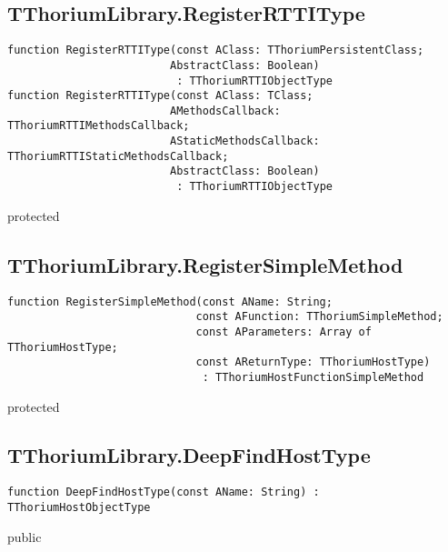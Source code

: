 \subsection{TThoriumLibrary.RegisterRTTIType}
\label{thoriumcore:thorium:tthoriumlibrary:registerrttitype}
\begin{FPCList}
\Synopsis
\Declaration 

\begin{verbatim}
function RegisterRTTIType(const AClass: TThoriumPersistentClass;
                         AbstractClass: Boolean)
                          : TThoriumRTTIObjectType
function RegisterRTTIType(const AClass: TClass;
                         AMethodsCallback: TThoriumRTTIMethodsCallback;
                         AStaticMethodsCallback: TThoriumRTTIStaticMethodsCallback;
                         AbstractClass: Boolean)
                          : TThoriumRTTIObjectType
\end{verbatim}
\Visibility
protected
\Description
\Errors
\end{FPCList}
\subsection{TThoriumLibrary.RegisterSimpleMethod}
\label{thoriumcore:thorium:tthoriumlibrary:registersimplemethod}
\begin{FPCList}
\Synopsis
\Declaration 

\begin{verbatim}
function RegisterSimpleMethod(const AName: String;
                             const AFunction: TThoriumSimpleMethod;
                             const AParameters: Array of TThoriumHostType;
                             const AReturnType: TThoriumHostType)
                              : TThoriumHostFunctionSimpleMethod
\end{verbatim}
\Visibility
protected
\Description
\Errors
\end{FPCList}
\subsection{TThoriumLibrary.DeepFindHostType}
\label{thoriumcore:thorium:tthoriumlibrary:deepfindhosttype}
\begin{FPCList}
\Synopsis
\Declaration 

\begin{verbatim}
function DeepFindHostType(const AName: String) : TThoriumHostObjectType
\end{verbatim}
\Visibility
public
\Description
\Errors
\end{FPCList}
